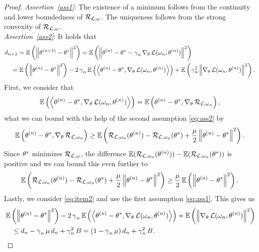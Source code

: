 \begin{proof}
\textit{Assertion~\ref{ass1}}: The existence of a minimum follows from the continuity and lower boundedness of $\risk_{\loss, \o}$. The uniqueness follows from the strong convexity of $\risk_{\loss, \o}$.\\
\textit{Assertion~\ref{ass2}}: It holds that
\begin{align}\label{eq:item2}
&d_{n+1} = \E\left( \left\| \t^{(n+1)} - \t^{\ast} \right\|^2 \right) = \E\left( \left\| \t^{(n)} - \t^{\ast} - \g_n \nabla_{\t} \loss(\o_n, \t^{(n)}) \right\|^2 \right)\nonumber\\
&\quad= \E\left( \left\| \t^{(n)} - \t^{\ast}\right\|^2 \right) - 2\g_n\E\left(\left\langle \t^{(n)}- \t^{\ast}, \nabla_{\t}\loss(\o_n, \t^{(n)}) \right\rangle\right) + \E \left( \g_n^2 \left\| \nabla_{\t} \loss(\o_n, \t^{(n)}) \right\|^2 \right).
\end{align}
First, we consider that
\begin{align*}
\E\left( \left\langle \t^{(n)} - \t^{\ast}, \nabla_{\t}\loss(\o_n, \t^{(n)}) \right\rangle \right)= \E\left( \t^{(n)} - \t^{\ast}, \nabla_{\t} \risk_{\loss, \o_n} \right),
\end{align*}
what we can bound with the help of the second assumption \eqref{eq:ass2} by
\begin{align*}
\E\left( \t^{(n)} - \t^{\ast}, \nabla_{\t} \risk_{\loss, \o_n} \right) \geq
\E\left( \risk_{\loss, \o_n} (\t^{(n)})	 - \risk_{\loss, \o_n} (\t^{\ast}) + \frac{\m}{2} \left\| \t^{(n)} - \t^{\ast} \right\|^2	\right).
\end{align*}
Since $\t^{\ast}$ minimizes $\risk_{\loss, \o}$, the difference $\E(\risk_{\loss, \o_n} (\t^{(n)})) - \E(\risk_{\loss, \o_n} (\t^{\ast}))$ is positive and we can bound this even further to
\begin{align*}
\E\left( \risk_{\loss, \o_n} (\t^{(n)})	 - \risk_{\loss, \o_n} (\t^{\ast}) + \frac{\m}{2} \left\| \t^{(n)} - \t^{\ast} \right\|^2	\right) \geq
\frac{\m}{2}\E\left( \left\| \t^{(n)} - \t^{\ast} \right\|^2\right).
\end{align*}
Lastly, we consider \eqref{eq:item2} and use the first assumption \eqref{eq:ass1}. This gives us
\begin{align*}
&\E\left( \left\| \t^{(n)} - \t^{\ast}\right\|^2 \right) - 2\g_n\E\left(\left\langle \t^{(n)}- \t^{\ast}, \nabla_{\t}\loss(\o_n, \t^{(n)}) \right\rangle\right) + \E \left( \left\| \nabla_{\t} \loss(\o_n, \t^{(n)}) \right\|^2 \right)\\
&\quad\leq d_n - \g_n\m d_n + \g_n^2B = \left(1 - \g_n\m\right)d_n + \g_n^2B.

\end{align*}
\end{proof}
